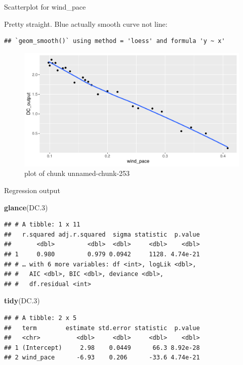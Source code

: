 \documentclass[
  ignorenonframetext,
]{beamer}
\newenvironment{Shaded}{\begin{snugshade}}{\end{snugshade}}
\newcommand{\FloatTok}[1]{\textcolor[rgb]{0.00,0.00,0.81}{#1}}
\newcommand{\KeywordTok}[1]{\textcolor[rgb]{0.13,0.29,0.53}{\textbf{#1}}}
\newcommand{\NormalTok}[1]{#1}
\begin{document}
\begin{frame}[fragile]{Scatterplot for wind\_pace}
\protect\hypertarget{scatterplot-for-wind_pace}{}

Pretty straight. Blue actually smooth curve not line:

\begin{verbatim}
## `geom_smooth()` using method = 'loess' and formula 'y ~ x'
\end{verbatim}

\begin{figure}
\centering
\includegraphics{figure/unnamed-chunk-253-1.pdf}
\caption{plot of chunk unnamed-chunk-253}
\end{figure}

\end{frame}

\begin{frame}[fragile]{Regression output}
\protect\hypertarget{regression-output}{}

\begin{Shaded}
\begin{Highlighting}[]
\KeywordTok{glance}\NormalTok{(DC}\FloatTok{.3}\NormalTok{)}
\end{Highlighting}
\end{Shaded}

\begin{verbatim}
## # A tibble: 1 x 11
##   r.squared adj.r.squared  sigma statistic  p.value
##       <dbl>         <dbl>  <dbl>     <dbl>    <dbl>
## 1     0.980         0.979 0.0942     1128. 4.74e-21
## # … with 6 more variables: df <int>, logLik <dbl>,
## #   AIC <dbl>, BIC <dbl>, deviance <dbl>,
## #   df.residual <int>
\end{verbatim}

\begin{Shaded}
\begin{Highlighting}[]
\KeywordTok{tidy}\NormalTok{(DC}\FloatTok{.3}\NormalTok{)}
\end{Highlighting}
\end{Shaded}

\begin{verbatim}
## # A tibble: 2 x 5
##   term        estimate std.error statistic  p.value
##   <chr>          <dbl>     <dbl>     <dbl>    <dbl>
## 1 (Intercept)     2.98    0.0449      66.3 8.92e-28
## 2 wind_pace      -6.93    0.206      -33.6 4.74e-21
\end{verbatim}

\end{frame}
\end{document}
